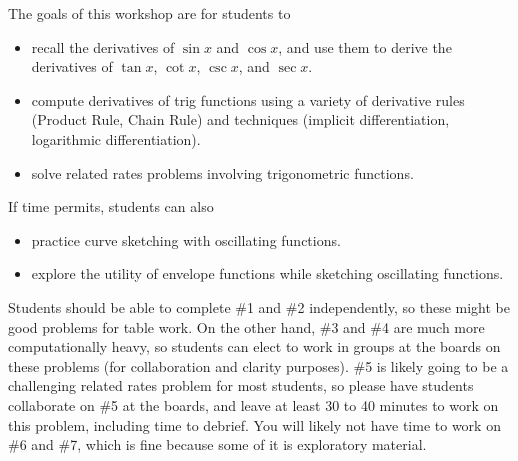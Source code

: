 \documentclass{article}
\begin{document}

\begin{workshop}
    The goals of this workshop are for students to
    \begin{itemize}
        \item recall the derivatives of $\sin x$ and $\cos x$, and use them to derive the derivatives of $\tan x$, $\cot x$, $\csc x$, and $\sec x$.
        \item compute derivatives of trig functions using a variety of derivative rules (Product Rule, Chain Rule) and techniques (implicit differentiation, logarithmic differentiation). 
        \item solve related rates problems involving trigonometric functions.
    \end{itemize}
    
    If time permits, students can also
    \begin{itemize}
    \item practice curve sketching with oscillating functions.
    \item explore the utility of envelope functions while sketching oscillating functions.
    \end{itemize}
Students should be able to complete \#1 and \#2 independently, so these might be good problems for table work. On the other hand, \#3 and \#4 are much more computationally heavy, so students can elect to work in groups at the boards on these problems (for collaboration and clarity purposes). \#5 is likely going to be a challenging related rates problem for most students, so please have students collaborate on \#5 at the boards, and leave at least 30 to 40 minutes to work on this problem, including time to debrief. You will likely not have time to work on \#6 and \#7, which is fine because some of it is exploratory material.
\end{workshop}
\end{document}
